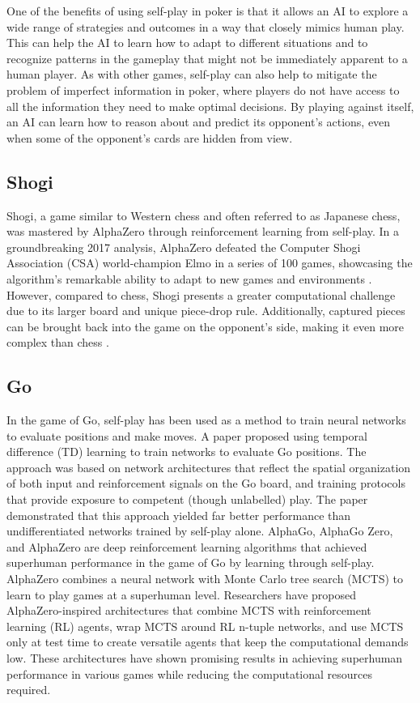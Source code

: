 \begin{spacing}{2.0}
One of the benefits of using self-play in poker is that it allows an AI to explore a wide range of strategies and outcomes in a way that closely mimics human play. This can help the AI to learn how to adapt to different situations and to recognize patterns in the gameplay that might not be immediately apparent to a human player. As with other games, self-play can also help to mitigate the problem of imperfect information in poker, where players do not have access to all the information they need to make optimal decisions. By playing against itself, an AI can learn how to reason about and predict its opponent's actions, even when some of the opponent's cards are hidden from view.

\subsection{Shogi}

Shogi, a game similar to Western chess and often referred to as Japanese chess, was mastered by AlphaZero through reinforcement learning from self-play. In a groundbreaking 2017 analysis, AlphaZero defeated the Computer Shogi Association (CSA) world-champion Elmo in a series of 100 games, showcasing the algorithm's remarkable ability to adapt to new games and environments \cite{MasteringChessShogi}. However, compared to chess, Shogi presents a greater computational challenge due to its larger board and unique piece-drop rule. Additionally, captured pieces can be brought back into the game on the opponent's side, making it even more complex than chess \cite{ComputerShogi}.

\subsection{Go}

In the game of Go, self-play has been used as a method to train neural networks to evaluate positions and make moves. A paper proposed using temporal difference (TD) learning to train networks to evaluate Go positions. The approach was based on network architectures that reflect the spatial organization of both input and reinforcement signals on the Go board, and training protocols that provide exposure to competent (though unlabelled) play. The paper demonstrated that this approach yielded far better performance than undifferentiated networks trained by self-play alone. AlphaGo, AlphaGo Zero, and AlphaZero are deep reinforcement learning algorithms that achieved superhuman performance in the game of Go by learning through self-play. AlphaZero combines a neural network with Monte Carlo tree search (MCTS) to learn to play games at a superhuman level. Researchers have proposed AlphaZero-inspired architectures that combine MCTS with reinforcement learning (RL) agents, wrap MCTS around RL n-tuple networks, and use MCTS only at test time to create versatile agents that keep the computational demands low. These architectures have shown promising results in achieving superhuman performance in various games while reducing the computational resources required.


\end{spacing}
